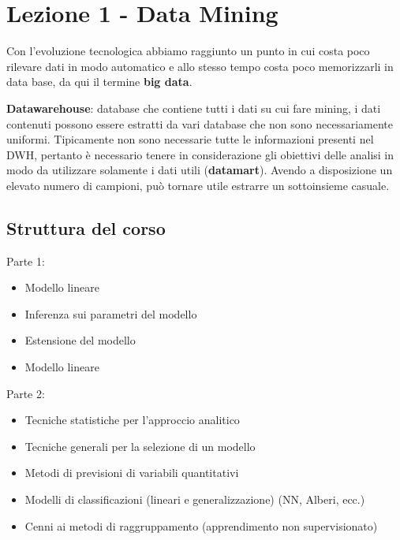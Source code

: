 \chapter{Lezione 1 - Data Mining}\label{lezione-1---data-mining}

Con l'evoluzione tecnologica abbiamo raggiunto un punto in cui costa
poco rilevare dati in modo automatico e allo stesso tempo costa poco
memorizzarli in data base, da qui il termine \textbf{big data}.

\textbf{Datawarehouse}: database che contiene tutti i dati su cui fare
mining, i dati contenuti possono essere estratti da vari database che
non sono necessariamente uniformi. Tipicamente non sono necessarie tutte
le informazioni presenti nel DWH, pertanto è necessario tenere in
considerazione gli obiettivi delle analisi in modo da utilizzare
solamente i dati utili (\textbf{datamart}). Avendo a disposizione un
elevato numero di campioni, può tornare utile estrarre un sottoinsieme
casuale.

\section{Struttura del corso}\label{struttura-del-corso}

Parte 1:

\begin{itemize}
\item
  Modello lineare
\item
  Inferenza sui parametri del modello
\item
  Estensione del modello
\item
  Modello lineare
\end{itemize}

Parte 2:

\begin{itemize}
\item
  Tecniche statistiche per l'approccio analitico
\item
  Tecniche generali per la selezione di un modello
\item
  Metodi di previsioni di variabili quantitativi
\item
  Modelli di classificazioni (lineari e generalizzazione) (NN, Alberi,
  ecc.)
\item
  Cenni ai metodi di raggruppamento (apprendimento non supervisionato)
\end{itemize}


